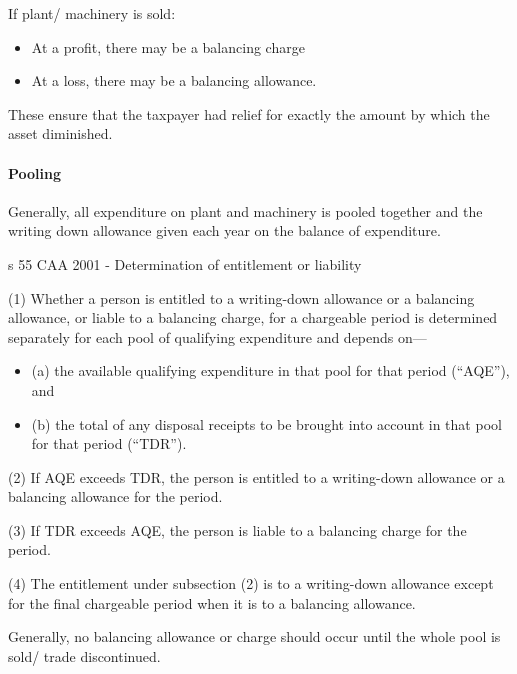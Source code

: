 \documentclass[
]{article}
\providecommand{\tightlist}{%
  \setlength{\itemsep}{0pt}\setlength{\parskip}{0pt}}
\newenvironment{env-b05156de-272c-4941-ad2d-f95253330136}
{
    \savenotes\tcolorbox[blanker,breakable,left=5pt,borderline west={2pt}{-4pt}{green}]
}
{
    \endtcolorbox\spewnotes
}
\begin{document}
If plant/ machinery is sold:

\begin{itemize}
\tightlist
\item
  At a profit, there may be a balancing charge
\item
  At a loss, there may be a balancing allowance.
\end{itemize}

These ensure that the taxpayer had relief for exactly the amount by
which the asset diminished.

\hypertarget{pooling}{%
\paragraph{Pooling}\label{pooling}}

Generally, all expenditure on plant and machinery is pooled together and
the writing down allowance given each year on the balance of
expenditure.

\begin{env-b05156de-272c-4941-ad2d-f95253330136}

s 55 CAA 2001 - Determination of entitlement or liability

(1) Whether a person is entitled to a writing-down allowance or a
balancing allowance, or liable to a balancing charge, for a chargeable
period is determined separately for each pool of qualifying expenditure
and depends on---

\begin{itemize}
\tightlist
\item
  (a) the available qualifying expenditure in that pool for that period
  (``AQE''), and
\item
  (b) the total of any disposal receipts to be brought into account in
  that pool for that period (``TDR'').
\end{itemize}

(2) If AQE exceeds TDR, the person is entitled to a writing-down
allowance or a balancing allowance for the period.

(3) If TDR exceeds AQE, the person is liable to a balancing charge for
the period.

(4) The entitlement under subsection (2) is to a writing-down allowance
except for the final chargeable period when it is to a balancing
allowance.

\end{env-b05156de-272c-4941-ad2d-f95253330136}

Generally, no balancing allowance or charge should occur until the whole
pool is sold/ trade discontinued.
\end{document}
